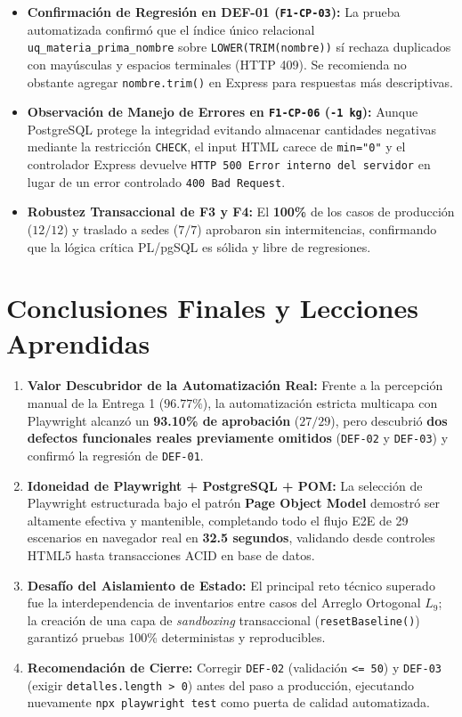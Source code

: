 \documentclass[11pt,a4paper]{article}
\begin{document}
\begin{itemize}
    \item \textbf{Confirmación de Regresión en DEF-01 (\texttt{F1-CP-03}):} La prueba automatizada confirmó que el índice único relacional \texttt{uq\_materia\_prima\_nombre} sobre \texttt{LOWER(TRIM(nombre))} sí rechaza duplicados con mayúsculas y espacios terminales (HTTP 409). Se recomienda no obstante agregar \texttt{nombre.trim()} en Express para respuestas más descriptivas.
    \item \textbf{Observación de Manejo de Errores en \texttt{F1-CP-06} (\texttt{-1 kg}):} Aunque PostgreSQL protege la integridad evitando almacenar cantidades negativas mediante la restricción \texttt{CHECK}, el input HTML carece de \texttt{min="0"} y el controlador Express devuelve \texttt{HTTP 500 Error interno del servidor} en lugar de un error controlado \texttt{400 Bad Request}.
    \item \textbf{Robustez Transaccional de F3 y F4:} El \textbf{100\%} de los casos de producción ($12/12$) y traslado a sedes ($7/7$) aprobaron sin intermitencias, confirmando que la lógica crítica PL/pgSQL es sólida y libre de regresiones.
\end{itemize}

\section{Conclusiones Finales y Lecciones Aprendidas}

\begin{enumerate}
    \item \textbf{Valor Descubridor de la Automatización Real:} Frente a la percepción manual de la Entrega 1 ($96.77\%$), la automatización estricta multicapa con Playwright alcanzó un \textbf{93.10\% de aprobación} ($27/29$), pero descubrió \textbf{dos defectos funcionales reales previamente omitidos} (\texttt{DEF-02} y \texttt{DEF-03}) y confirmó la regresión de \texttt{DEF-01}.
    \item \textbf{Idoneidad de Playwright + PostgreSQL + POM:} La selección de Playwright estructurada bajo el patrón \textbf{Page Object Model} demostró ser altamente efectiva y mantenible, completando todo el flujo E2E de 29 escenarios en navegador real en \textbf{32.5 segundos}, validando desde controles HTML5 hasta transacciones ACID en base de datos.
    \item \textbf{Desafío del Aislamiento de Estado:} El principal reto técnico superado fue la interdependencia de inventarios entre casos del Arreglo Ortogonal $L_9$; la creación de una capa de \textit{sandboxing} transaccional (\texttt{resetBaseline()}) garantizó pruebas 100\% deterministas y reproducibles.
    \item \textbf{Recomendación de Cierre:} Corregir \texttt{DEF-02} (validación \texttt{<= 50}) y \texttt{DEF-03} (exigir \texttt{detalles.length > 0}) antes del paso a producción, ejecutando nuevamente \texttt{npx playwright test} como puerta de calidad automatizada.
\end{enumerate}
\end{document}
